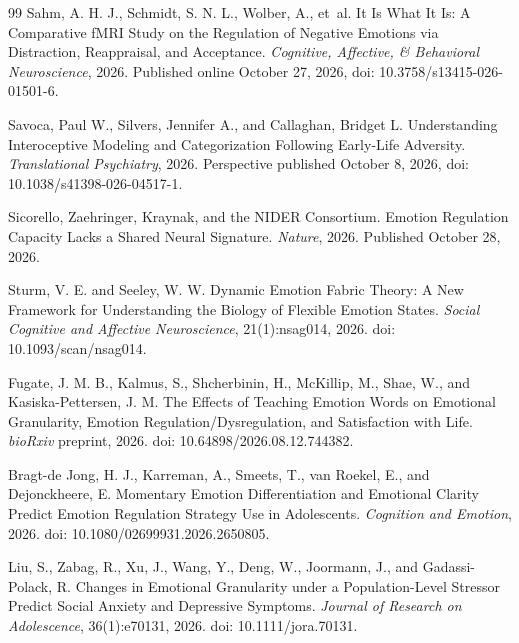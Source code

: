 \documentclass[11pt]{article}
\begin{document}
\begin{thebibliography}{99}
Sahm, A. H. J., Schmidt, S. N. L., Wolber, A., et~al.
\newblock It Is What It Is: A Comparative fMRI Study on the Regulation of Negative Emotions via Distraction, Reappraisal, and Acceptance.
\newblock \emph{Cognitive, Affective, \& Behavioral Neuroscience}, 2026.
\newblock Published online October 27, 2026, doi: 10.3758/s13415-026-01501-6.

Savoca, Paul W., Silvers, Jennifer A., and Callaghan, Bridget L.
\newblock Understanding Interoceptive Modeling and Categorization Following Early-Life Adversity.
\newblock \emph{Translational Psychiatry}, 2026.
\newblock Perspective published October 8, 2026, doi: 10.1038/s41398-026-04517-1.

Sicorello, Zaehringer, Kraynak, and the NIDER Consortium.
\newblock Emotion Regulation Capacity Lacks a Shared Neural Signature.
\newblock \emph{Nature}, 2026. Published October 28, 2026.

Sturm, V. E. and Seeley, W. W.
\newblock Dynamic Emotion Fabric Theory: A New Framework for Understanding the Biology of Flexible Emotion States.
\newblock \emph{Social Cognitive and Affective Neuroscience}, 21(1):nsag014, 2026.
\newblock doi: 10.1093/scan/nsag014.

Fugate, J. M. B., Kalmus, S., Shcherbinin, H., McKillip, M., Shae, W., and Kasiska-Pettersen, J. M.
\newblock The Effects of Teaching Emotion Words on Emotional Granularity, Emotion Regulation/Dysregulation, and Satisfaction with Life.
\newblock \emph{bioRxiv} preprint, 2026.
\newblock doi: 10.64898/2026.08.12.744382.

Bragt-de Jong, H. J., Karreman, A., Smeets, T., van Roekel, E., and Dejonckheere, E.
\newblock Momentary Emotion Differentiation and Emotional Clarity Predict Emotion Regulation Strategy Use in Adolescents.
\newblock \emph{Cognition and Emotion}, 2026.
\newblock doi: 10.1080/02699931.2026.2650805.

Liu, S., Zabag, R., Xu, J., Wang, Y., Deng, W., Joormann, J., and Gadassi-Polack, R.
\newblock Changes in Emotional Granularity under a Population-Level Stressor Predict Social Anxiety and Depressive Symptoms.
\newblock \emph{Journal of Research on Adolescence}, 36(1):e70131, 2026.
\newblock doi: 10.1111/jora.70131.


\end{thebibliography}
\end{document}
